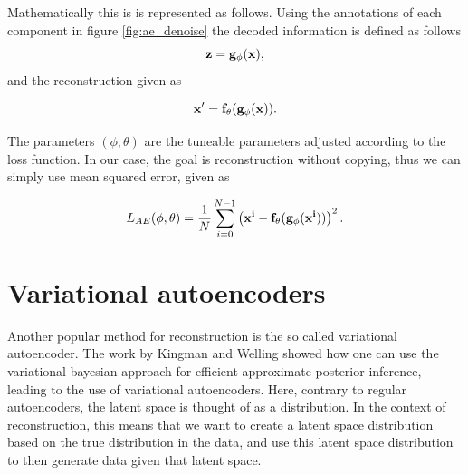 Mathematically this is is represented as follows\cite{weng2018VAE}. Using the annotations of each component in figure \ref{fig:ae_denoise} the decoded information is defined as follows 
\begin{equation*}
    \bf{z} = g_{\phi}(\bf{x}),
\end{equation*}    
and the reconstruction given as 

\begin{equation*}
    \bf{x'} = f_{\theta}(g_{\phi}(\bf{x})).
\end{equation*}  

The parameters $(\phi,\theta)$ are the tuneable parameters adjusted according to the loss function. In our case, the goal is
reconstruction without copying, thus we can simply use mean squared error, given as 

\begin{equation}\label{eq:loss_ae}
    L_{AE} (\phi,\theta) = \frac{1}{N}\sum_{i=0}^{N-1} \left(\bf{x}^{i} - f_{\theta}(g_{\phi}(\bf{x}^{i}))\right)^{2}.
\end{equation}

\section{Variational autoencoders}
Another popular method for reconstruction is the so called variational autoencoder. The work by Kingman and Welling \cite{VAE} showed how
one can use the variational bayesian approach for efficient approximate posterior inference, leading to the use of variational autoencoders.
Here, contrary to regular autoencoders, the latent space is thought of as a distribution. In the context of reconstruction, this means that
we want to create a latent space distribution based on the true distribution in the data, and use this latent space distribution to then generate
data given that latent space. 
